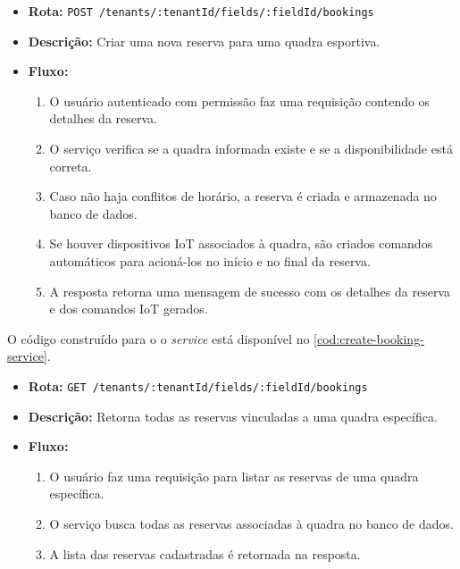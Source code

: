 \begin{itemize}
    \item \textbf{Rota:} \texttt{POST /tenants/:tenantId/fields/:fieldId/bookings}
    \item \textbf{Descrição:} Criar uma nova reserva para uma quadra esportiva.
    \item \textbf{Fluxo:}
    \begin{enumerate}
        \item O usuário autenticado com permissão faz uma requisição contendo os detalhes da reserva.
        \item O serviço verifica se a quadra informada existe e se a disponibilidade está correta.
        \item Caso não haja conflitos de horário, a reserva é criada e armazenada no banco de dados.
        \item Se houver dispositivos IoT associados à quadra, são criados comandos automáticos para acioná-los no início e no final da reserva.
        \item A resposta retorna uma mensagem de sucesso com os detalhes da reserva e dos comandos IoT gerados.
    \end{enumerate}
\end{itemize}

O código construído para o o \textit{service} está disponível no \autoref{cod:create-booking-service}.

\begin{itemize}
    \item \textbf{Rota:} \texttt{GET /tenants/:tenantId/fields/:fieldId/bookings}
    \item \textbf{Descrição:} Retorna todas as reservas vinculadas a uma quadra específica.
    \item \textbf{Fluxo:}
    \begin{enumerate}
        \item O usuário faz uma requisição para listar as reservas de uma quadra específica.
        \item O serviço busca todas as reservas associadas à quadra no banco de dados.
        \item A lista das reservas cadastradas é retornada na resposta.
    \end{enumerate}
\end{itemize}


